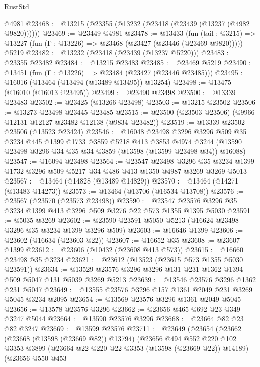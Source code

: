 \begin{lexlean}{RustStd}
\begin{coremodule}
    @4981
@23468 := @13215 (@23355 (@13232 (@23418 (@23439 (@13237 (@4982 @9820))))))
@23469 := @23449 @4981
@23478 := @13433
    (fun (tail : @3215) => @13227 (fun (Γ : @13226) => @23468 (@23427 (@23446 (@23469 @9820)))))
    @5219
@23482 := @13232 (@23418 (@23439 (@13237 @5220)))
@23483 := @23355 @23482
@23484 := @13215 @23483
@23485 := @23469 @5219
@23490 := @13451 (fun (Γ : @13226) => @23484 (@23427 (@23446 @23485)))
@23495 := @16016 (@13464 (@13494 (@13489 @13495)) @13254)
@23498 := @13475 (@16010 (@16013 @23495))
@23499 := @23490 @23498
@23500 := @13339 @23483
@23502 := @23425 (@13266 @23498)
@23503 := @13215 @23502
@23506 := @13273 @23498 @23445 @23485
@23515 := @23500 (@23503 @23506) (@9966 @12131 @12127 @23482 @12138 (@9834 @23482))
@23519 := @13339 @23502 @23506 (@13523 @23424)
@23546 := @16048
    @23498
    @3296
    @3296
    @509
    @35
    @3234
    @445
    @1399
    @1733
    @3859
    @5218
    @413
    @3853
    @4974
    @3244
    (@13590 @23498 @3296 @34 @35 @34 @3859 (@13598 (@13599 @23498 @34)) @16088)
@23547 := @16094 @23498
@23564 := @23547
    @23498
    @3296
    @35
    @3234
    @1399
    @1732
    @3296
    @509
    @5217
    @34
    @486
    @413
    @1350
    @4987
    @3269
    @3269
    @5013
@23567 := @13464 (@14828 (@13489 @14829))
@23570 := @13464 (@14271 (@13483 @14273))
@23573 := @13464 (@13706 (@16534 @13708))
@23576 := @23567 (@23570 (@23573 @23498))
@23590 := @23547 @23576 @3296 @35 @3234 @1399 @413 @3296 @509 @3276 @22 @573 @1355 @1395 @5030
@23591 := @5035 @3269
@23602 := @23590 @23591 @5050 @5213 (@16624 @23498 @3296 @35 @3234 @1399 @3296 @509)
@23603 := @16646 @1399
@23606 := @23602 (@16634 (@23603 @22))
@23607 := @16652 @35
@23608 := @23607 @1399
@23612 := @23606 (@10432 (@23608 @413 @573))
@23615 := @16660 @23498 @35 @3234
@23621 := @23612 (@13523 (@23615 @573 @1355 @5030 @23591))
@23634 := @13529 @23576 @3296 @3296 @131 @231 @1362 @1394 @509 @5047 @131 @5039 @3269 @5213
@23639 := @13546 @23576 @3296 @1362 @231 @5047
@23649 := @13555 @23576 @3296 @157 @1361 @2049 @231 @3269 @5045 @3234 @2095
@23654 := @13569 @23576 @3296 @1361 @2049 @5045
@23656 := @13578 @23576 @3296
@23662 := @23656 @465 @692 @23 @349 @3247 @5044
@23664 := @13590 @23576 @3296
@23668 := @23664 @82 @23 @82 @3247
@23669 := @13599 @23576
@23711 := @23649
    (@23654
      (@23662
        (@23668 (@13598 (@23669 @82)) @13794)
        (@23656
          @494
          @552
          @220
          @102
          @3353
          @3899
          (@23664 @22 @220 @22 @3353 (@13598 (@23669 @22)) @14189)
          (@23656
            @550
            @453

\end{coremodule}
\end{lexlean}
